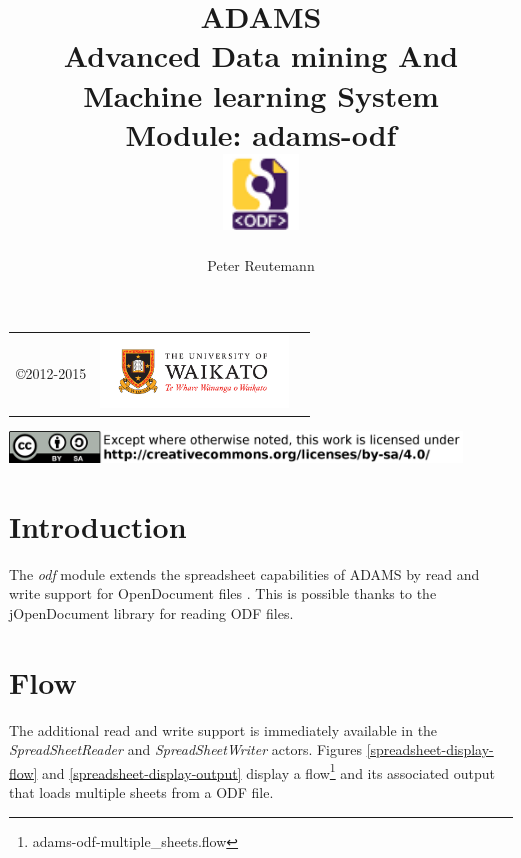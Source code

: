 \documentclass[a4paper]{book}
\title{
  \textbf{ADAMS} \\
  {\Large \textbf{A}dvanced \textbf{D}ata mining \textbf{A}nd \textbf{M}achine
  learning \textbf{S}ystem} \\
  {\Large Module: adams-odf} \\
  \vspace{1cm}
  \includegraphics[width=2cm]{images/odf-module.png} \\
}
\author{
  Peter Reutemann
}
\begin{document}
\begin{titlepage}
\maketitle

\thispagestyle{empty}
\center
\begin{table}[b]
	\begin{tabular}{c l l}
		\parbox[c][2cm]{2cm}{\copyright 2012-2015} &
		\parbox[c][2cm]{5cm}{\includegraphics[width=5cm]{images/coat_of_arms.pdf}} \\
	\end{tabular}
	\includegraphics[width=12cm]{images/cc.png} \\
\end{table}

\end{titlepage}

\tableofcontents
\listoffigures

\chapter{Introduction}
The \textit{odf} module extends the spreadsheet capabilities of ADAMS by read
and write support for OpenDocument files \cite{odf}. This is possible thanks 
to the jOpenDocument library \cite{jopendocument} for reading ODF files.

\chapter{Flow}
The additional read and write support is immediately available in the 
\textit{SpreadSheetReader} and \textit{SpreadSheetWriter} actors.
Figures \ref{spreadsheet-display-flow} and \ref{spreadsheet-display-output}
display a flow\footnote{adams-odf-multiple\_sheets.flow} and its associated
output that loads multiple sheets from a ODF file.
\end{document}
